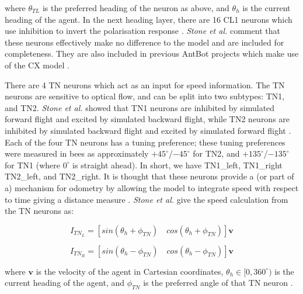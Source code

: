 \documentclass[a4paper,11pt,twoside,openright]{article}
\begin{document}
where $\theta_{TL}$ is the preferred heading of the neuron as above, and
$\theta_{h}$ is the current heading of the agent. In the next heading layer,
there are 16 CL1 neurons which use inhibition to invert the polarisation
response \cite{Stone2017}. \textit{Stone et al.} comment that these neurons
effectively make no difference to the model and are included for completeness.
They are also included in previous AntBot projects which make use of the CX model
\cite{Zhang2017, Scimeca2017}.
\newline
\par

There are 4 TN neurons which act as an input for speed information. The TN
neurons are sensitive to optical flow, and can be split into two subtypes:
TN1, and TN2. \textit{Stone et al.} showed that TN1 neurons are inhibited by
simulated forward flight and excited by simulated backward flight, while TN2
neurons are inhibited by simulated backward flight and excited by simulated
forward flight \cite{Stone2017}. Each of the four TN neurons has a tuning
preference; these tuning preferences were measured in bees as approximately
$+45^{\circ}$/$-45^{\circ}$ for TN2, and $+135^{\circ}$/$-135^{\circ}$ for TN1
(where $0^{\circ}$ is straight ahead). In short, we have TN1_{left}, TN1_{right}
TN2_{left}, and TN2_{right}. It is thought that these neurons provide a
(or part of a) mechanism for odometry by allowing the model to integrate
speed with respect to time giving a distance measure \cite{Stone2017}.
\textit{Stone et al.} give the speed calculation from the TN neurons
as:

\begin{equation}
  I_{TN_{L}} =
  [ sin(\theta_{h} + \phi_{TN}) \quad cos(\theta_{h} + \phi_{TN}) ]\mathbf{v}
\end{equation}

\begin{equation}
  I_{TN_{R}} =
  [ sin(\theta_{h} - \phi_{TN}) \quad cos(\theta_{h} - \phi_{TN}) ]\mathbf{v}
\end{equation}

where $\mathbf{v}$ is the velocity of the agent in Cartesian coordinates,
$\theta_h \in [0, 360^{\circ})$ is the current heading of the agent, and
$\phi_{TN}$ is the preferred angle of that TN neuron \cite{Stone2017}.


\end{document}
